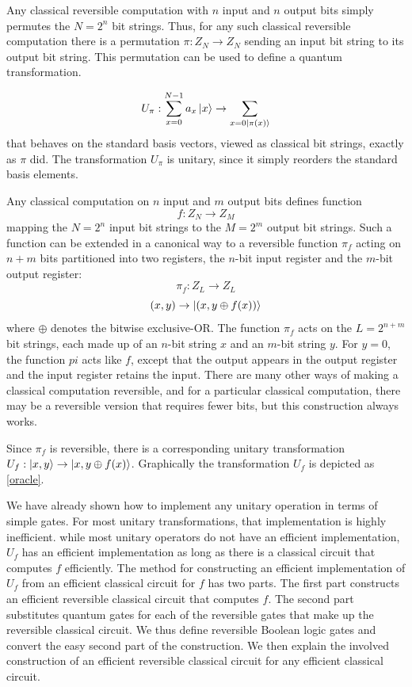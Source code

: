 Any classical reversible computation with $n$ input and $n$ output bits simply permutes the $N=2^n$ bit strings. Thus, for any such classical reversible computation there is a permutation $\pi:Z_N \rightarrow Z_N$ sending an input bit string to its output bit string. This permutation can be used to define a quantum transformation.

\[
U_{\pi}:\sum_{x=0}^{N-1}a_x\ket{x}\rightarrow \sum_{x=0\ket{\pi(x)}}
\]
that behaves on the standard basis vectors, viewed as classical bit strings, exactly as $\pi$ did. The transformation $U_{\pi}$ is unitary, since it simply reorders the standard basis elements.

Any classical computation on $n$ input and $m$ output bits defines function
\[
f:Z_N\rightarrow Z_M
\]
mapping the $N=2^n$ input bit strings to the $M=2^m$ output bit strings. Such a function can be extended in a canonical way to a reversible function $\pi_f$ acting on $n+m$ bits partitioned into two registers, the $n$-bit input register and the $m$-bit output register:
\[
\pi_f:Z_L\rightarrow Z_L
\]
\[
(x,y)\rightarrow \ket{(x,y\oplus f(x))}
\]
where $\oplus$ denotes the bitwise exclusive-OR. The function $\pi_f$ acts on the $L=2^{n+m}$ bit strings, each made up of an $n$-bit string $x$ and an $m$-bit string $y$. For $y=0$, the function $pi$ acts like $f$, except that the output appears in the output register and the input register retains the input. There are many other ways of making a classical computation reversible, and for a particular classical computation, there may be a reversible version that requires fewer bits, but this construction always works.

Since $\pi_f$ is reversible, there is a corresponding unitary transformation $U_f:\ket{x,y}\rightarrow \ket{x,y\oplus f(x)}$. Graphically the transformation $U_f$ is depicted as \ref{oracle}.

We have already shown how to implement any unitary operation in terms of simple gates. For most unitary transformations, that implementation is highly inefficient. while most unitary operators do not have an efficient implementation, $U_f$ has an efficient implementation as long as there is a classical circuit that computes $f$ efficiently. The method for constructing an efficient implementation of $U_f$ from an efficient classical circuit for $f$ has two parts. The first part constructs an efficient reversible classical circuit that computes $f$. The second part substitutes quantum gates for each of the reversible gates that make up the reversible classical circuit. We thus define reversible Boolean logic gates and convert the easy second part of the construction. We then explain the involved construction of an efficient reversible classical circuit for any efficient classical circuit.

